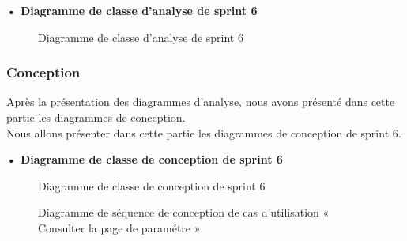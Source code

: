 \setlength{\parskip}{1em}
\setlength{\parindent}{0em}

\textbf{•	Diagramme de classe d'analyse de sprint 6 }


\begin{figure}[H]
  \centering
  \caption{Diagramme de classe d'analyse de sprint 6}
  \label{fig:class_analyse_sprint6}
\end{figure}


\subsubsection{Conception}

Après la présentation des diagrammes d'analyse, nous avons présenté dans cette partie les diagrammes de conception.\\ 
Nous allons présenter dans cette partie les diagrammes de conception de sprint 6. 
\begin{landscape}

\textbf{•	Diagramme de classe de conception de sprint 6}

\begin{figure}[H]
  \centering
  \caption{Diagramme de classe de conception de sprint 6}
  \label{fig:class_diagram_61}
\end{figure}
\end{landscape}


\begin{figure}[H]
  \centering
  \caption{Diagramme de séquence de conception de cas d'utilisation « Consulter la page de paramétre »}
  \label{fig:conception_sequence_consult_settings_page}
\end{figure}

